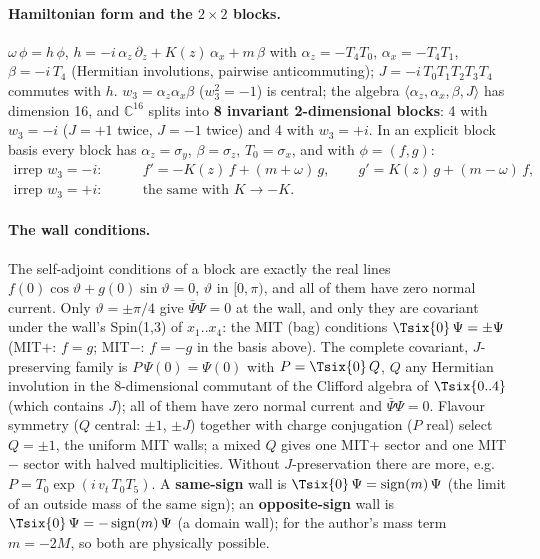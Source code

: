 \paragraph{Hamiltonian form and the $2\times2$ blocks.} $\omega\,\phi=h\,\phi$,
$h=-i\,\alpha_z\,\partial_z+K(z)\,\alpha_x+m\,\beta$ with $\alpha_z=-T_4T_0$, $\alpha_x=-T_4T_1$,
$\beta=-i\,T_4$ (Hermitian involutions, pairwise anticommuting); $J=-i\,T_0T_1T_2T_3T_4$ commutes with $h$.
$w_3=\alpha_z\alpha_x\beta$ ($w_3^2=-1$) is central; the algebra $\langle\alpha_z,\alpha_x,\beta,J\rangle$ has
dimension 16, and $\mathbb C^{16}$ splits into \textbf{8 invariant 2-dimensional blocks}: 4 with $w_3=-i$
($J=+1$ twice, $J=-1$ twice) and 4 with $w_3=+i$. In an explicit block basis every block has
$\alpha_z=\sigma_y$, $\beta=\sigma_z$, $T_0=\sigma_x$, and with $\phi=(f,g)$:
\begin{align*}
  \text{irrep } w_3=-i:&\qquad f'=-K(z)\,f+(m+\omega)\,g,\qquad g'=K(z)\,g+(m-\omega)\,f,\\
  \text{irrep } w_3=+i:&\qquad \text{the same with } K\to-K .
\end{align*}

\paragraph{The wall conditions.} The self-adjoint conditions of a block are exactly the real lines
$f(0)\cos\vartheta+g(0)\sin\vartheta=0$, $\vartheta$ in $[0,\pi)$, and all of them have zero normal current.
Only $\vartheta=\pm\pi/4$ give $\bar\Psi\Psi=0$ at the wall, and only they are covariant under the wall's
Spin(1,3) of $x_1..x_4$: the MIT (bag) conditions $\Tsix{0}\,\Psi=\pm\Psi$ (MIT$+$: $f=g$; MIT$-$: $f=-g$ in
the basis above). The complete covariant, $J$-preserving family is $P\,\Psi(0)=\Psi(0)$ with
$P=\Tsix{0}\,Q$, $Q$ any Hermitian involution in the 8-dimensional commutant of the Clifford algebra of
$\Tsix{0..4}$ (which contains $J$); all of them have zero normal current and $\bar\Psi\Psi=0$. Flavour
symmetry ($Q$ central: $\pm1$, $\pm J$) together with charge conjugation ($P$ real) select $Q=\pm1$, the
uniform MIT walls; a mixed $Q$ gives one MIT$+$ sector and one MIT$-$ sector with halved multiplicities.
Without $J$-preservation there are more, e.g.\ $P=T_0\exp(i\,v_t\,T_0T_5)$. A \textbf{same-sign} wall is
$\Tsix{0}\,\Psi=\operatorname{sign}(m)\,\Psi$ (the limit of an outside mass of the same sign); an
\textbf{opposite-sign} wall is $\Tsix{0}\,\Psi=-\operatorname{sign}(m)\,\Psi$ (a domain wall); for the
author's mass term $m=-2M$, so both are physically possible.

